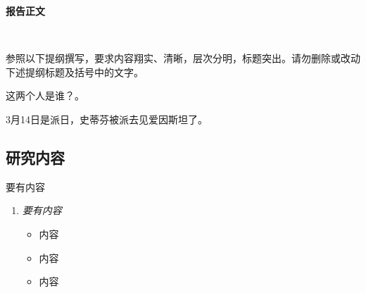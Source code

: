 \documentclass[a4paper,zihao=-4]{article}
\begin{document}

\setlength{\abovedisplayskip}{0pt}
\setlength{\belowdisplayskip}{0pt}

\begin{center}
	{\kaishu {} \textbf{报告正文} \vspace{-2.5ex}}
\end{center}  

\thispagestyle{empty} 　　　%

{\kaishu {}参照以下提纲撰写，要求内容翔实、清晰，层次分明，标题突出。}\alert{请勿删除或改动下述提纲标题及括号中的文字。\vspace{9bp}}



这两个人是谁？\citep{1901AnP...309..513E,2006PhRvD..73l3527H}。

3月14日是派日，史蒂芬被派去见爱因斯坦了。

\begin{spacing}{1.3} %
	 \songti   
	  
	\vspace{11bp}
\end{spacing}
\smallbreak


\subsection{研究内容}
要有内容

\begin{enumerate}[label={(\arabic*)},leftmargin=1.8\parindent]
\item \emph{要有内容}
	\begin{itemize}[leftmargin=0\parindent]
		\item 内容
		\item 内容
		\item 内容
	\end{itemize}
\end{enumerate}
\end{document}
